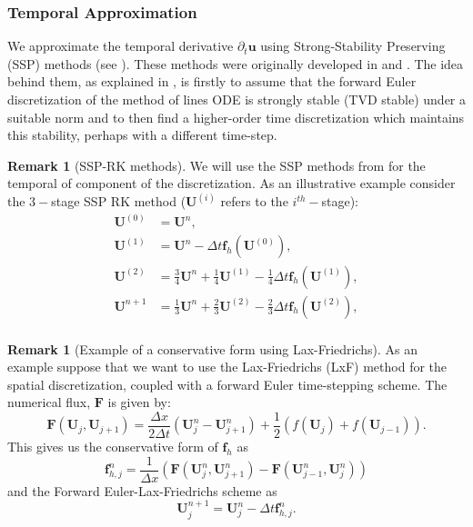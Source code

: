 \documentclass[12pt,a4paper]{article}
\numberwithin{equation}{section}
\theoremstyle{definition}
\newcommand{\vect}[1]{\textbf{#1}}
\newcommand{\qp}[1]{\left(#1\right)}
\newtheorem{Rem}[subsection]{Remark}
\begin{document}
\subsubsection{Temporal Approximation}
We approximate the temporal derivative $\partial_t\vect{u}$ using Strong-Stability Preserving (SSP) methods (see \cite{gottlieb2001strong}).  These methods were originally developed in \cite{shu1988total} and \cite{shu1988efficient}.  The idea behind them, as explained in \cite{gottlieb2001strong}, is firstly to assume that the forward Euler discretization of the method of lines ODE is strongly stable (TVD stable) under a suitable norm and to then find a higher-order time discretization which maintains this stability, perhaps with a different time-step.

\begin{Rem}[SSP-RK methods]
We will use the SSP methods  from \cite{shu1988total} for the temporal of component  of the discretization. As an illustrative example consider the $3-$stage SSP RK method ($\vect{U}^{\qp{i}}$ refers to the $i^{th}-$stage):
\begin{equation}
\begin{aligned}
\textbf{U}^{\qp{0}}&=\textbf{U}^n,\\
\textbf{U}^{\qp{1}}&=\textbf{U}^n-\Delta t \vect{f}_h\qp{\textbf{U}^{\qp{0}}},\\
\textbf{U}^{\qp{2}}&=\frac{3}{4}\textbf{U}^n +\frac{1}{4}\textbf{U}^{\qp{1}} -\frac{1}{4}\Delta t \vect{f}_h\qp{\textbf{U}^{\qp{1}}},\\
\textbf{U}^{n+1}&=\frac{1}{3}\textbf{U}^n +\frac{2}{3}\textbf{U}^{\qp{2}} -\frac{2}{3}\Delta t \vect{f}_h\qp{\textbf{U}^{\qp{2}}},\\
\end{aligned}
\end{equation}
\end{Rem}

\begin{Rem}[Example of a conservative form using Lax-Friedrichs]
	As an example suppose that we want to use the Lax-Friedrichs (LxF) method for the spatial discretization, coupled with a forward Euler time-stepping scheme. The numerical flux, $\vect{F}$ is given by:
	\begin{equation}\label{eq_F_Lxf_conservative}
	\vect{F}\qp{\vect{U}_j, \vect{U}_{j+1}}=\frac{\Delta x}{2\Delta t}\qp{\vect{U}^n_j-\vect{U}^n_{j+1}}+\frac{1 }{2}\qp{f\qp{\vect{U}_{j}}+f\qp{\vect{U}_{j-1}}}.
	\end{equation}
	This gives us the conservative form of $\vect{f}_h$ as
	\begin{equation}
	\vect{f}^n_{h,j}= \frac{1}{\Delta x}\qp{\vect{F}\qp{\vect{U}^n_j, \vect{U}^n_{j+1}}-\vect{F}\qp{\vect{U}^n_{j-1}, \vect{U}^n_{j}}}
	\end{equation}
	and the Forward Euler-Lax-Friedrichs scheme as 
	\begin{equation}
	\vect{U}^{n+1}_j=\vect{U}^n_j-\Delta t\vect{f}^n_{h,j}.
	\end{equation}
\end{Rem}
\end{document}
